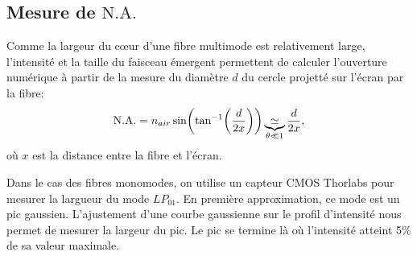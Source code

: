 \documentclass[10pt,letterpaper,twocolumn]{article}
\DeclarePairedDelimiter\autobracket{(}{)}
\newcommand{\br}[1]{\autobracket*{#1}}
\newcommand{\na}{\text{N.A.}}
\begin{document}
\subsection{Mesure de $\na$}\label{sec:mesureDeNa}
Comme la largeur du c\oe{}ur d'une fibre multimode est relativement large, l'intensité et la taille du faisceau émergent permettent de calculer l'ouverture numérique à partir de la mesure du diamètre $d$ du cercle projetté sur l'écran  par la fibre:
\begin{equation}\label{eq:na}
	\na = n_{air}\sin\br{\tan^{-1}\br{\frac{d}{2x}}} \underbrace{\simeq}_{\theta \ll 1} \frac{d}{2x},
\end{equation}
où $x$ est la distance entre la fibre et l'écran.\par
Dans le cas des fibres monomodes, on utilise un capteur CMOS Thorlabs pour mesurer la largueur du mode $LP_{01}$. En première approximation, ce mode est un pic gaussien. L'ajustement d'une courbe gaussienne sur le profil d'intensité nous permet de mesurer la largeur du pic. Le pic se termine là où l'intensité atteint 5\% de sa valeur maximale. \par 
\end{document}

